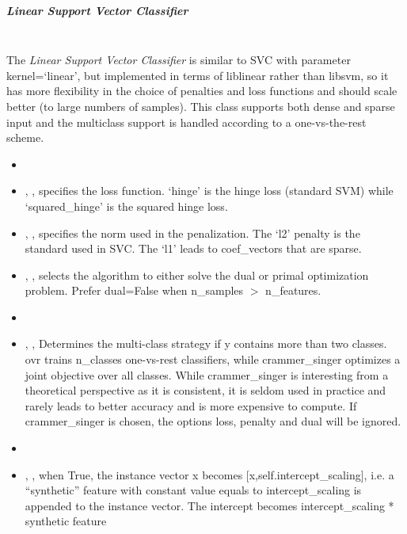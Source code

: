 \subparagraph{Linear Support Vector Classifier}
\mbox{}
\\The \textit{Linear Support Vector Classifier} is similar to SVC with parameter
kernel=`linear', but implemented in terms of liblinear rather than libsvm,
so it has more flexibility in the choice of penalties and loss functions and
should scale better (to large numbers of samples).
%
This class supports both dense and sparse input and the multiclass support is
handled according to a one-vs-the-rest scheme.
%
\begin{itemize}
  \item {}
  \item {}, , specifies the loss
  function.
  `hinge' is the hinge loss (standard SVM) while `squared\_hinge' is the squared hinge
  loss.
  \item {}, , specifies the norm
  used in the penalization.
  The `l2' penalty is the standard used in SVC.
  The `l1' leads to coef\_vectors that are sparse.
  \item {}, , selects the algorithm to either solve
  the dual or primal optimization problem.
  Prefer dual=False when n\_samples $>$ n\_features.
  \item {}
  \item {}, ,
  Determines the multi-class strategy if y contains more than two classes.
  ovr trains n\_classes one-vs-rest classifiers, while
  crammer\_singer optimizes a joint objective over all classes.
  While crammer\_singer is interesting from a theoretical perspective as it is
  consistent, it is seldom used in practice and rarely leads to better accuracy
  and is more expensive to compute.
  If crammer\_singer is chosen, the options loss, penalty and dual
  will be ignored.
  \item {}
  \item {}, , when
  True, the instance vector x becomes [x,self.intercept\_scaling], i.e. a
  ``synthetic'' feature with constant value equals to intercept\_scaling is
  appended to the instance vector.
  The intercept becomes intercept\_scaling * synthetic feature

\end{itemize}
